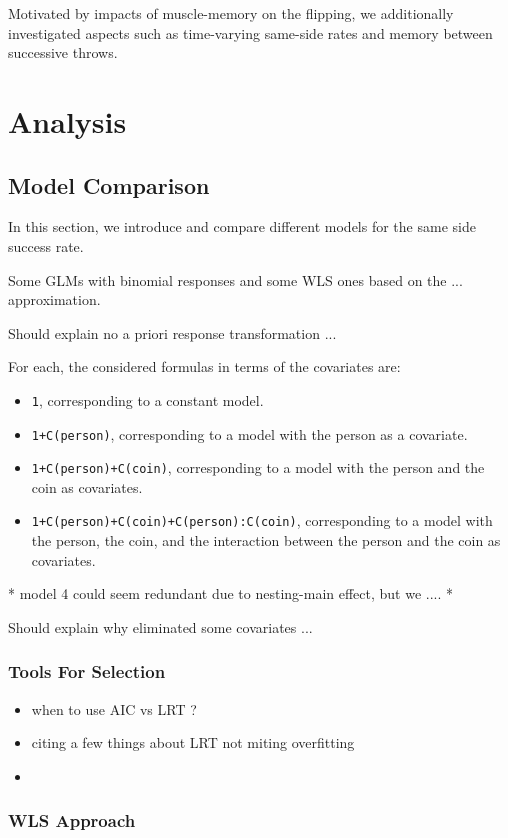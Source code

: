 \documentclass[a4paper, 12pt,oneside]{article}
\begin{document}
		Motivated by impacts of muscle-memory on the flipping, we additionally investigated aspects such as time-varying same-side rates and memory between successive throws.
	\section{Analysis}
		\subsection{Model Comparison}
			In this section, we introduce and compare different models for the same side success rate. 

			Some GLMs with binomial responses and some WLS ones based on the ... approximation.
			
			Should explain no a priori response transformation ...
			
			For each, the considered formulas in terms of the covariates are:
			\begin{itemize}
				\item \texttt{1}, corresponding to a constant model.
				\item \texttt{1+C(person)}, corresponding to a model with the person as a covariate.
				\item \texttt{1+C(person)+C(coin)}, corresponding to a model with the person and the coin as covariates.
				\item \texttt{1+C(person)+C(coin)+C(person):C(coin)}, corresponding to a model with the person, the coin, and the interaction between the person and the coin as covariates.
			\end{itemize}
			* model 4 could seem redundant due to nesting-main effect, but we ....
			*  

			Should explain why eliminated some covariates ...
			\subsubsection{Tools For Selection}
			\begin{itemize}
				\item when to use AIC vs LRT ?
				\item citing a few things about LRT not miting overfitting 
				\item 
			\end{itemize}
			\subsubsection{WLS Approach}
\end{document}
